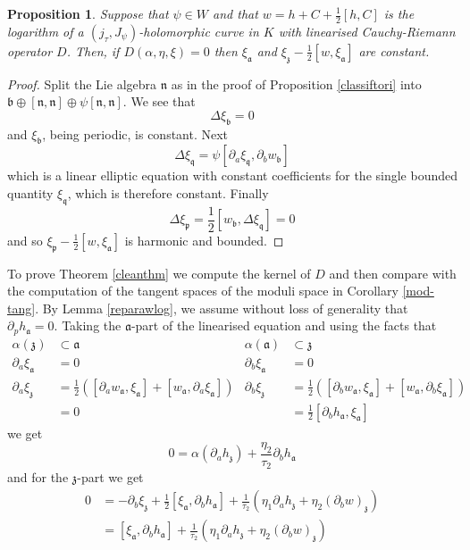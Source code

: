 \documentclass[11pt]{amsart}
\newcommand{\WW}{W}
\newcommand{\nn}{\mathfrak{n}}
\renewcommand{\aa}{\mathfrak{a}}
\newcommand{\zz}{\mathfrak{z}}
\newcommand{\bb}{\mathfrak{b}}
\newcommand{\pp}{\mathfrak{p}}
\newcommand{\qq}{\mathfrak{q}}
\numberwithin{equation}{section}
\newtheorem{prp}[equation]{Proposition}
\theoremstyle{definition}
\theoremstyle{remark}
\begin{document}
\begin{prp}
Suppose that $\psi\in\WW$ and that $w=h+C+\frac{1}{2}[h,C]$ is the logarithm of a $(j_{\tau},J_{\psi})$-holomorphic curve in $K$ with linearised Cauchy-Riemann operator $D$. Then, if $D(\alpha,\eta,\xi)=0$ then $\xi_{\aa}$ and $\xi_{\zz}-\frac{1}{2}[w,\xi_{\aa}]$ are constant.
\end{prp}

\begin{proof}
Split the Lie algebra $\nn$ as in the proof of Proposition \ref{classiftori} into $\bb\oplus[\nn,\nn]\oplus\psi[\nn,\nn]$. We see that
\[\Delta\xi_{\bb}=0\]
and $\xi_{\bb}$, being periodic, is constant. Next
\[\Delta\xi_{\qq}=\psi[\partial_{a}\xi_{\qq},\partial_{b}w_{\bb}]\]
which is a linear elliptic equation with constant coefficients for the single bounded quantity $\xi_{\qq}$, which is therefore constant. Finally
\[\Delta\xi_{\pp}=\frac{1}{2}[w_{\bb},\Delta\xi_{\qq}]=0\]
and so $\xi_{\pp}-\frac{1}{2}[w,\xi_{\aa}]$ is harmonic and bounded.
\end{proof}

To prove Theorem \ref{cleanthm} we compute the kernel of $D$ and then compare with the computation of the tangent spaces of the moduli space in Corollary \ref{mod-tang}. By Lemma \ref{reparawlog}, we assume without loss of generality that $\partial_ph_{\aa}=0$. Taking the $\aa$-part of the linearised equation and using the facts that
\begin{align*}
\alpha(\zz)&\subset\aa&\alpha(\aa)&\subset\zz\\
\partial_a\xi_{\aa}&=0 & \partial_b\xi_{\aa}&=0\\
\partial_a\xi_{\zz}&=\frac{1}{2}\left([\partial_aw_{\aa},\xi_{\aa}]+[w_{\aa},\partial_a\xi_{\aa}]\right)&\partial_b\xi_{\zz}&=\frac{1}{2}\left([\partial_bw_{\aa},\xi_{\aa}]+[w_{\aa},\partial_b\xi_{\aa}]\right)\\
&=0&&=\frac{1}{2}[\partial_bh_{\aa},\xi_{\aa}]
\end{align*}
we get
\[0=\alpha(\partial_ah_{\zz})+\frac{\eta_2}{\tau_2}\partial_bh_{\aa}\]
and for the $\zz$-part we get
\begin{align*}
0&=-\partial_b\xi_{\zz}+\frac{1}{2}[\xi_{\aa},\partial_bh_{\aa}]+\frac{1}{\tau_2}\left(\eta_1\partial_ah_{\zz}+\eta_2(\partial_bw)_{\zz}\right)\\
&=[\xi_{\aa},\partial_bh_{\aa}]+\frac{1}{\tau_2}\left(\eta_1\partial_ah_{\zz}+\eta_2(\partial_bw)_{\zz}\right)
\end{align*}
\end{document}
